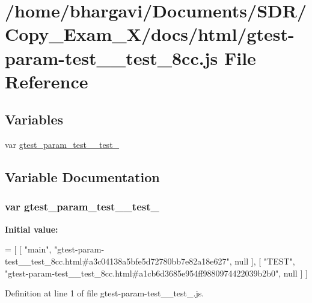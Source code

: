 \hypertarget{gtest-param-test____test__8cc_8js}{}\section{/home/bhargavi/\+Documents/\+S\+D\+R/\+Copy\+\_\+\+Exam\+\_\+X/docs/html/gtest-\/param-\/test\+\_\+\+\_\+test\+\_\+8cc.js File Reference}
\label{gtest-param-test____test__8cc_8js}
\subsection*{Variables}
\begin{DoxyCompactItemize}
\item 
var \hyperlink{gtest-param-test____test__8cc_8js_a91a1ec6f702e76b14809021512a1dc02}{gtest\+\_\+param\+\_\+test\+\_\+\+\_\+test\+\_}
\end{DoxyCompactItemize}


\subsection{Variable Documentation}
\subsubsection[{\texorpdfstring{gtest\+\_\+param\+\_\+test\+\_\+\+\_\+test\+\_\+8cc}{gtest_param_test__test_8cc}}]{\setlength{\rightskip}{0pt plus 5cm}var gtest\+\_\+param\+\_\+test\+\_\+\+\_\+test\+\_}\hypertarget{gtest-param-test____test__8cc_8js_a91a1ec6f702e76b14809021512a1dc02}{}\label{gtest-param-test____test__8cc_8js_a91a1ec6f702e76b14809021512a1dc02}
{\bfseries Initial value\+:}
\begin{DoxyCode}
=
[
    [ \textcolor{stringliteral}{"main"}, \textcolor{stringliteral}{"gtest-param-test\_\_test\_8cc.html#a3c04138a5bfe5d72780bb7e82a18e627"}, null ],
    [ \textcolor{stringliteral}{"TEST"}, \textcolor{stringliteral}{"gtest-param-test\_\_test\_8cc.html#a1cb6d3685e954ff9880974422039b2b0"}, null ]
]
\end{DoxyCode}


Definition at line 1 of file gtest-\/param-\/test\+\_\+\+\_\+test\+\_.\+js.


